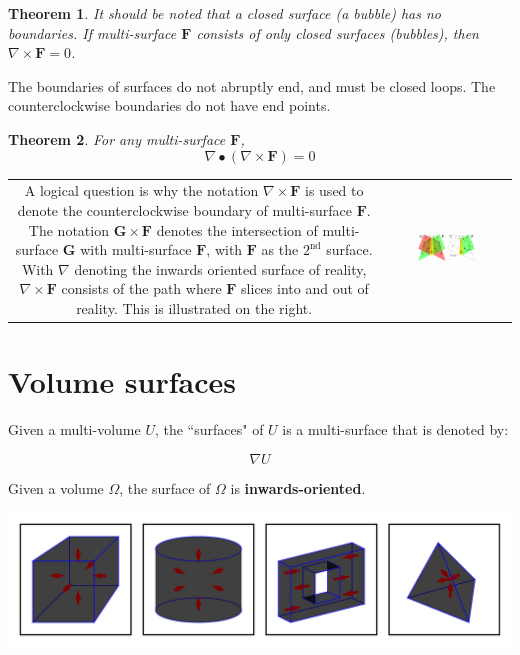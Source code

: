 \documentclass{book}
\newtheorem{thm}{Theorem}
\begin{document}
\begin{thm}
It should be noted that a closed surface (a bubble) has no boundaries. If multi-surface \(\mathbf{F}\) consists of only closed surfaces (bubbles), then \(\nabla \times \mathbf{F} = 0\). 
\end{thm}

The boundaries of surfaces do not abruptly end, and must be closed loops. The counterclockwise boundaries do not have end points. 
\begin{thm}
For any multi-surface \(\mathbf{F}\), 
\[\nabla \bullet (\nabla \times \mathbf{F}) = 0\]
\end{thm}

\begin{tabular}{cc}
\parbox{0.5\textwidth}{
A logical question is why the notation \(\nabla \times \mathbf{F}\) is used to denote the counterclockwise boundary of multi-surface \(\mathbf{F}\). The notation \(\mathbf{G} \times \mathbf{F}\) denotes the intersection of multi-surface \(\mathbf{G}\) with multi-surface \(\mathbf{F}\), with \(\mathbf{F}\) as the \(2^\text{nd}\) surface. With \(\nabla\) denoting the inwards oriented surface of reality, \(\nabla \times \mathbf{F}\) consists of the path where \(\mathbf{F}\) slices into and out of reality. This is illustrated on the right.
} & \parbox{0.5\textwidth}{
\includegraphics[width = 0.5\textwidth]{Boundaries/Surface_boundaries/right_hand_rule_for_boundaries}
}
\end{tabular}




\section{Volume surfaces}

Given a multi-volume \(U\), the ``surfaces" of \(U\) is a multi-surface that is denoted by: 

\[\nabla U\]

Given a volume \(\Omega\), the surface of \(\Omega\) is {\bf inwards-oriented}. 

\begin{center}
\includegraphics[width = \textwidth]{Boundaries/Volume_inwards_oriented_surfaces/volume_surface_examples}
\end{center}
\end{document}
